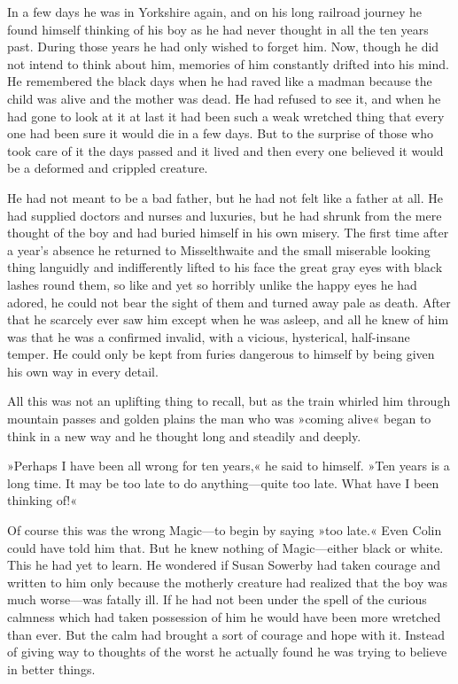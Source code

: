 In a few days he was in Yorkshire again, and on his long railroad journey he found himself thinking of his boy as he had never thought in all the ten years past. During those years he had only wished to forget him. Now, though he did not intend to think about him, memories of him constantly drifted into his mind. He remembered the black days when he had raved like a madman because the child was alive and the mother was dead. He had refused to see it, and when he had gone to look at it at last it had been such a weak wretched thing that every one had been sure it would die in a few days. But to the surprise of those who took care of it the days passed and it lived and then every one believed it would be a deformed and crippled creature.

He had not meant to be a bad father, but he had not felt like a father at all. He had supplied doctors and nurses and luxuries, but he had shrunk from the mere thought of the boy and had buried himself in his own misery. The first time after a year's absence he returned to Misselthwaite and the small miserable looking thing languidly and indifferently lifted to his face the great gray eyes with black lashes round them, so like and yet so horribly unlike the happy eyes he had adored, he could not bear the sight of them and turned away pale as death. After that he scarcely ever saw him except when he was asleep, and all he knew of him was that he was a confirmed invalid, with a vicious, hysterical, half-insane temper. He could only be kept from furies dangerous to himself by being given his own way in every detail.

All this was not an uplifting thing to recall, but as the train whirled him through mountain passes and golden plains the man who was »coming alive« began to think in a new way and he thought long and steadily and deeply.

»Perhaps I have been all wrong for ten years,« he said to himself. »Ten years is a long time. It may be too late to do anything—quite too late. What have I been thinking of!«

Of course this was the wrong Magic—to begin by saying »too late.« Even Colin could have told him that. But he knew nothing of Magic—either black or white. This he had yet to learn. He wondered if Susan Sowerby had taken courage and written to him only because the motherly creature had realized that the boy was much worse—was fatally ill. If he had not been under the spell of the curious calmness which had taken possession of him he would have been more wretched than ever. But the calm had brought a sort of courage and hope with it. Instead of giving way to thoughts of the worst he actually found he was trying to believe in better things.

